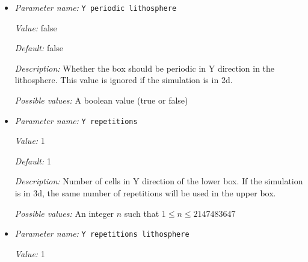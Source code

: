\begin{itemize}
{\it Value:} false


{\it Default:} false


{\it Description:} Whether the box should be periodic in Y direction.


{\it Possible values:} A boolean value (true or false)
\item {\it Parameter name:} {\tt Y periodic lithosphere}
\label{parameters:Geometry model/Box with lithosphere boundary indicators/Y periodic lithosphere}
\label{parameters:Geometry_20model/Box_20with_20lithosphere_20boundary_20indicators/Y_20periodic_20lithosphere}


{\it Value:} false


{\it Default:} false


{\it Description:} Whether the box should be periodic in Y direction in the lithosphere. This value is ignored if the simulation is in 2d. 


{\it Possible values:} A boolean value (true or false)
\item {\it Parameter name:} {\tt Y repetitions}
\label{parameters:Geometry model/Box with lithosphere boundary indicators/Y repetitions}
\label{parameters:Geometry_20model/Box_20with_20lithosphere_20boundary_20indicators/Y_20repetitions}


{\it Value:} 1


{\it Default:} 1


{\it Description:} Number of cells in Y direction of the lower box. If the simulation is in 3d, the same number of repetitions will be used in the upper box.


{\it Possible values:} An integer $n$ such that $1\leq n \leq 2147483647$
\item {\it Parameter name:} {\tt Y repetitions lithosphere}
\label{parameters:Geometry model/Box with lithosphere boundary indicators/Y repetitions lithosphere}
\label{parameters:Geometry_20model/Box_20with_20lithosphere_20boundary_20indicators/Y_20repetitions_20lithosphere}


{\it Value:} 1



\end{itemize}
